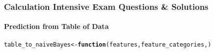 \documentclass[../../dsa1101_notes.Rtex]{subfiles}\usepackage[]{graphicx}\usepackage[]{color}
\makeatletter
\newcommand{\hlkwd}[1]{\textcolor[rgb]{0.737,0.353,0.396}{\textbf{#1}}}%
\newenvironment{kframe}{%
 \def\at@end@of@kframe{}%
 \ifinner\ifhmode%
  \def\at@end@of@kframe{\end{minipage}}%
  \begin{minipage}{\columnwidth}%
 \fi\fi%
 \def\FrameCommand##1{\hskip\@totalleftmargin \hskip-\fboxsep
 \colorbox{shadecolor}{##1}\hskip-\fboxsep
     \hskip-\linewidth \hskip-\@totalleftmargin \hskip\columnwidth}%
 \MakeFramed {\advance\hsize-\width
   \@totalleftmargin\z@ \linewidth\hsize
   \@setminipage}}%
 {\par\unskip\endMakeFramed%
 \at@end@of@kframe}
\newenvironment{knitrout}{}{} %
\makeatother
\begin{document}
\subsubsection{Calculation Intensive Exam Questions \& Solutions}
\paragraph{Prediction from Table of Data}
\begin{knitrout}
\color{fgcolor}\begin{kframe}
\begin{alltt}
table_to_naiveBayes <- \hlkwd{function}(features, feature_categories, )
\end{alltt}


{\ttfamily\noindent\bfseries{}}\end{kframe}
\end{knitrout}
\end{document}
